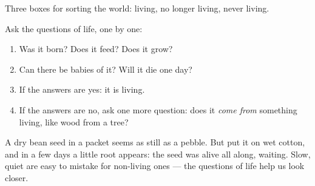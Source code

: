 \begin{omfigure}

{\small Three boxes for sorting the world: living, no longer living,
never living.}
\end{omfigure}

\begin{method}\label{met:g1:living-or-not:decide}
Ask the questions of life, one by one:
\begin{enumerate}
  \item Was it born? Does it feed? Does it grow?
  \item Can there be babies of it? Will it die one day?
  \item If the answers are yes: it is living.
  \item If the answers are no, ask one more question: does it
        \emph{come from} something living, like wood from a tree?
\end{enumerate}
\end{method}

\begin{remark}\label{rem:g1:living-or-not:seed}
A dry bean seed in a packet seems as still as a pebble. But put it
on wet cotton, and in a few days a little root appears: the seed was
alive all along, waiting. Slow, quiet  are easy to
mistake for non-living ones --- the questions of life help us look
closer.
\end{remark}

